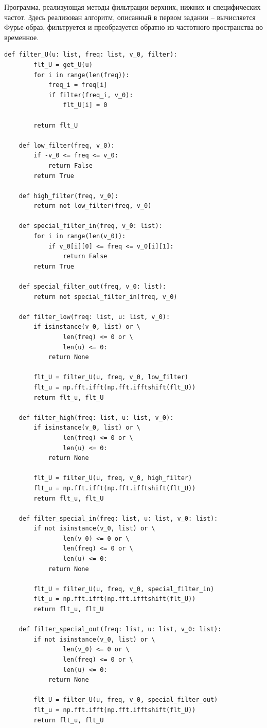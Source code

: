 \documentclass[a4paper, 12pt]{article}
\begin{document}
    Программа, реализующая методы фильтрации верхних, нижних и специфических частот.
    Здесь реализован алгоритм, описанный в первом задании -- вычисляется Фурье-образ,
    фильтруется и преобразуется обратно из частотного пространства во временное.
    \begin{lstlisting}[label=l4, caption={Файл filters.py. Реализация фильтров}]
    def filter_U(u: list, freq: list, v_0, filter):
        flt_U = get_U(u)
        for i in range(len(freq)):
            freq_i = freq[i]
            if filter(freq_i, v_0):
                flt_U[i] = 0
    
        return flt_U
    
    def low_filter(freq, v_0):
        if -v_0 <= freq <= v_0:
            return False
        return True
    
    def high_filter(freq, v_0):
        return not low_filter(freq, v_0)
    
    def special_filter_in(freq, v_0: list):
        for i in range(len(v_0)):
            if v_0[i][0] <= freq <= v_0[i][1]:
                return False
        return True

    def special_filter_out(freq, v_0: list):
        return not special_filter_in(freq, v_0)
    
    def filter_low(freq: list, u: list, v_0):
        if isinstance(v_0, list) or \
                len(freq) <= 0 or \
                len(u) <= 0:
            return None
    
        flt_U = filter_U(u, freq, v_0, low_filter)
        flt_u = np.fft.ifft(np.fft.ifftshift(flt_U))
        return flt_u, flt_U
    
    def filter_high(freq: list, u: list, v_0):
        if isinstance(v_0, list) or \
                len(freq) <= 0 or \
                len(u) <= 0:
            return None
    
        flt_U = filter_U(u, freq, v_0, high_filter)
        flt_u = np.fft.ifft(np.fft.ifftshift(flt_U))
        return flt_u, flt_U
    
    def filter_special_in(freq: list, u: list, v_0: list):
        if not isinstance(v_0, list) or \
                len(v_0) <= 0 or \
                len(freq) <= 0 or \
                len(u) <= 0:
            return None
    
        flt_U = filter_U(u, freq, v_0, special_filter_in)
        flt_u = np.fft.ifft(np.fft.ifftshift(flt_U))
        return flt_u, flt_U

    def filter_special_out(freq: list, u: list, v_0: list):
        if not isinstance(v_0, list) or \
                len(v_0) <= 0 or \
                len(freq) <= 0 or \
                len(u) <= 0:
            return None
    
        flt_U = filter_U(u, freq, v_0, special_filter_out)
        flt_u = np.fft.ifft(np.fft.ifftshift(flt_U))
        return flt_u, flt_U
    \end{lstlisting}
\end{document}
